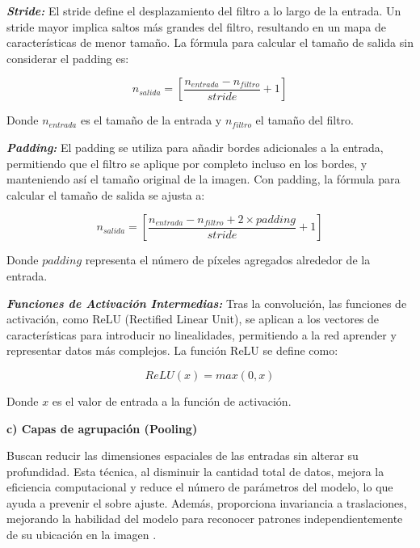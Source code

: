 \textbf{\textit{Stride:}} El stride define el desplazamiento del filtro a lo largo de la entrada. Un stride mayor implica saltos más grandes del filtro, resultando en un mapa de características de menor tamaño. La fórmula para calcular el tamaño de salida sin considerar el padding es:

\begin{equation}
    \label{ecu:conv_stride_sin_padding}
    n_{salida} = \left[ \frac{n_{entrada} - n_{filtro}}{stride} + 1 \right]
\end{equation}

Donde \( n_{entrada} \) es el tamaño de la entrada y \( n_{filtro} \) el tamaño del filtro.

\textbf{\textit{Padding:}} El padding se utiliza para añadir bordes adicionales a la entrada, permitiendo que el filtro se aplique por completo incluso en los bordes, y manteniendo así el tamaño original de la imagen. Con padding, la fórmula para calcular el tamaño de salida se ajusta a:

\begin{equation}
    \label{ecu:conv_stride_con_padding}
    n_{salida} = \left[ \frac{n_{entrada} - n_{filtro} + 2 \times padding}{stride} + 1 \right]
\end{equation}

Donde \( padding \) representa el número de píxeles agregados alrededor de la entrada.

\textbf{\textit{Funciones de Activación Intermedias:}} Tras la convolución, las funciones de activación, como ReLU (Rectified Linear Unit), se aplican a los vectores de características para introducir no linealidades, permitiendo a la red aprender y representar datos más complejos. La función ReLU se define como:

\begin{equation}
    \label{ecu:relu}
    ReLU(x) = max(0, x)
\end{equation}

Donde \( x \) es el valor de entrada a la función de activación.

\textbf{c) Capas de agrupación (Pooling)}

Buscan reducir las dimensiones espaciales de las entradas sin alterar su profundidad. Esta técnica, al disminuir la cantidad total de datos, mejora la eficiencia computacional y reduce el número de parámetros del modelo, lo que ayuda a prevenir el sobre ajuste. Además, proporciona invariancia a traslaciones, mejorando la habilidad del modelo para reconocer patrones independientemente de su ubicación en la imagen \cite{geron2019hands, patterson2017deep}.

